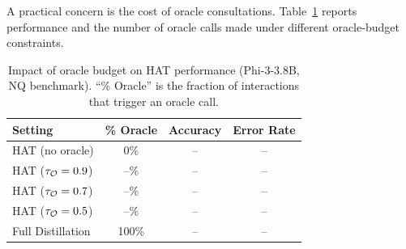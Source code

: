 A practical concern is the cost of oracle consultations.
Table~\ref{tab:oracle_budget} reports performance and the number of oracle calls made under different oracle-budget constraints.

\begin{table}[t]
  \centering
  \caption{Impact of oracle budget on HAT performance (Phi-3-3.8B, NQ benchmark).  ``\% Oracle'' is the fraction of interactions that trigger an oracle call.}
  \label{tab:oracle_budget}
  \small
  \begin{tabular}{@{}lccc@{}}
    \toprule
    \textbf{Setting} & \textbf{\% Oracle} & \textbf{Accuracy} & \textbf{Error Rate} \\
    \midrule
    HAT (no oracle)       & 0\%   & -- & -- \\
    HAT ($\tau_{\mathcal{O}}=0.9$) & --\%  & -- & -- \\
    HAT ($\tau_{\mathcal{O}}=0.7$) & --\%  & -- & -- \\
    HAT ($\tau_{\mathcal{O}}=0.5$) & --\%  & -- & -- \\
    Full Distillation     & 100\% & -- & -- \\
    \bottomrule
  \end{tabular}
\end{table}

